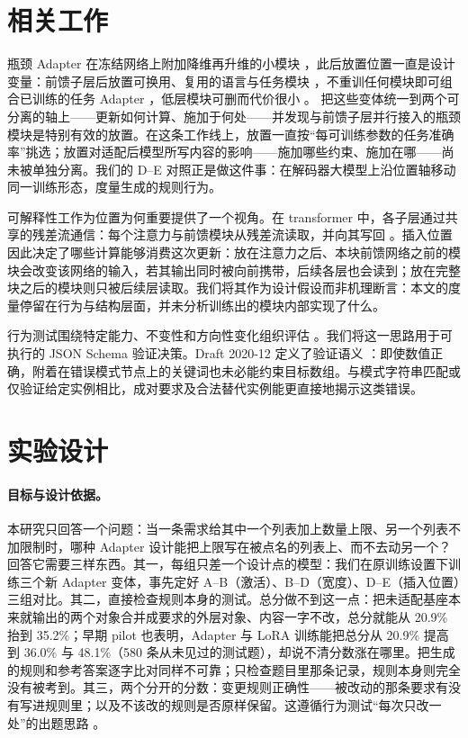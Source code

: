 \section{相关工作}
瓶颈 Adapter 在冻结网络上附加降维再升维的小模块 \citep{houlsby2019}，此后放置位置一直是设计变量：前馈子层后放置可换用、复用的语言与任务模块 \citep{pfeiffer2020}，不重训任何模块即可组合已训练的任务 Adapter \citep{pfeiffer2021}，低层模块可删而代价很小 \citep{ruckle2021}。\citet{he2022} 把这些变体统一到两个可分离的轴上——更新如何计算、施加于何处——并发现与前馈子层并行接入的瓶颈模块是特别有效的放置。在这条工作线上，放置一直按“每可训练参数的任务准确率”挑选；放置对适配后模型所写内容的影响——施加哪些约束、施加在哪——尚未被单独分离。我们的 D--E 对照正是做这件事：在解码器大模型上沿位置轴移动同一训练形态，度量生成的规则行为。

可解释性工作为位置为何重要提供了一个视角。在 transformer 中，各子层通过共享的残差流通信：每个注意力与前馈模块从残差流读取，并向其写回 \citep{elhage2021}。插入位置因此决定了哪些计算能够消费这次更新：放在注意力之后、本块前馈网络之前的模块会改变该网络的输入，若其输出同时被向前携带，后续各层也会读到；放在完整块之后的模块则只被后续层读取。我们将其作为设计假设而非机理断言：本文的度量停留在行为与结构层面，并未分析训练出的模块内部实现了什么。

行为测试围绕特定能力、不变性和方向性变化组织评估 \citep{ribeiro2020}。我们将这一思路用于可执行的 JSON Schema 验证决策。Draft 2020-12 定义了验证语义 \citep{jsonschema}：即使数值正确，附着在错误模式节点上的关键词也未必能约束目标数组。与模式字符串匹配或仅验证给定实例相比，成对要求及合法替代实例能更直接地揭示这类错误。

\section{实验设计}
\paragraph{目标与设计依据。}
本研究只回答一个问题：当一条需求给其中一个列表加上数量上限、另一个列表不加限制时，哪种 Adapter 设计能把上限写在被点名的列表上、而不去动另一个？回答它需要三样东西。其一，每组只差一个设计点的模型：我们在原训练设置下训练三个新 Adapter 变体，事先定好 A--B（激活）、B--D（宽度）、D--E（插入位置）三组对比。其二，直接检查规则本身的测试。总分做不到这一点：把未适配基座本来就输出的两个对象合并成要求的外层对象、内容一字不改，总分就能从 20.9\% 抬到 35.2\%；早期 pilot 也表明，Adapter 与 LoRA 训练能把总分从 20.9\% 提高到 36.0\% 与 48.1\%（580 条从未见过的测试题），却说不清分数涨在哪里。把生成的规则和参考答案逐字比对同样不可靠；只检查题目里那条记录，规则本身则完全没有被考到。其三，两个分开的分数：变更规则正确性——被改动的那条要求有没有写进规则里；以及不该改的规则是否原样保留。这遵循行为测试“每次只改一处”的出题思路 \citep{ribeiro2020}。

